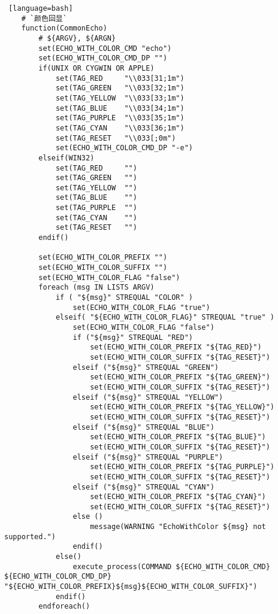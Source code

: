 {\begin{lstlisting} [language=bash]
    # `颜色回显`
    function(CommonEcho)
        # ${ARGV}, ${ARGN}
        set(ECHO_WITH_COLOR_CMD "echo")
        set(ECHO_WITH_COLOR_CMD_DP "")
        if(UNIX OR CYGWIN OR APPLE)
            set(TAG_RED     "\\033[31;1m")
            set(TAG_GREEN   "\\033[32;1m")
            set(TAG_YELLOW  "\\033[33;1m")
            set(TAG_BLUE    "\\033[34;1m")
            set(TAG_PURPLE  "\\033[35;1m")
            set(TAG_CYAN    "\\033[36;1m")
            set(TAG_RESET   "\\033[;0m")
            set(ECHO_WITH_COLOR_CMD_DP "-e")
        elseif(WIN32)
            set(TAG_RED     "")
            set(TAG_GREEN   "")
            set(TAG_YELLOW  "")
            set(TAG_BLUE    "")
            set(TAG_PURPLE  "")
            set(TAG_CYAN    "")
            set(TAG_RESET   "")
        endif()

        set(ECHO_WITH_COLOR_PREFIX "")
        set(ECHO_WITH_COLOR_SUFFIX "")
        set(ECHO_WITH_COLOR_FLAG "false")
        foreach (msg IN LISTS ARGV)
            if ( "${msg}" STREQUAL "COLOR" )
                set(ECHO_WITH_COLOR_FLAG "true")
            elseif( "${ECHO_WITH_COLOR_FLAG}" STREQUAL "true" )
                set(ECHO_WITH_COLOR_FLAG "false")
                if ("${msg}" STREQUAL "RED")
                    set(ECHO_WITH_COLOR_PREFIX "${TAG_RED}")
                    set(ECHO_WITH_COLOR_SUFFIX "${TAG_RESET}")
                elseif ("${msg}" STREQUAL "GREEN")
                    set(ECHO_WITH_COLOR_PREFIX "${TAG_GREEN}")
                    set(ECHO_WITH_COLOR_SUFFIX "${TAG_RESET}")
                elseif ("${msg}" STREQUAL "YELLOW")
                    set(ECHO_WITH_COLOR_PREFIX "${TAG_YELLOW}")
                    set(ECHO_WITH_COLOR_SUFFIX "${TAG_RESET}")
                elseif ("${msg}" STREQUAL "BLUE")
                    set(ECHO_WITH_COLOR_PREFIX "${TAG_BLUE}")
                    set(ECHO_WITH_COLOR_SUFFIX "${TAG_RESET}")
                elseif ("${msg}" STREQUAL "PURPLE")
                    set(ECHO_WITH_COLOR_PREFIX "${TAG_PURPLE}")
                    set(ECHO_WITH_COLOR_SUFFIX "${TAG_RESET}")
                elseif ("${msg}" STREQUAL "CYAN")
                    set(ECHO_WITH_COLOR_PREFIX "${TAG_CYAN}")
                    set(ECHO_WITH_COLOR_SUFFIX "${TAG_RESET}")
                else ()
                    message(WARNING "EchoWithColor ${msg} not supported.")
                endif()
            else()
                execute_process(COMMAND ${ECHO_WITH_COLOR_CMD} ${ECHO_WITH_COLOR_CMD_DP} "${ECHO_WITH_COLOR_PREFIX}${msg}${ECHO_WITH_COLOR_SUFFIX}")
            endif()
        endforeach()


\end{lstlisting}}
